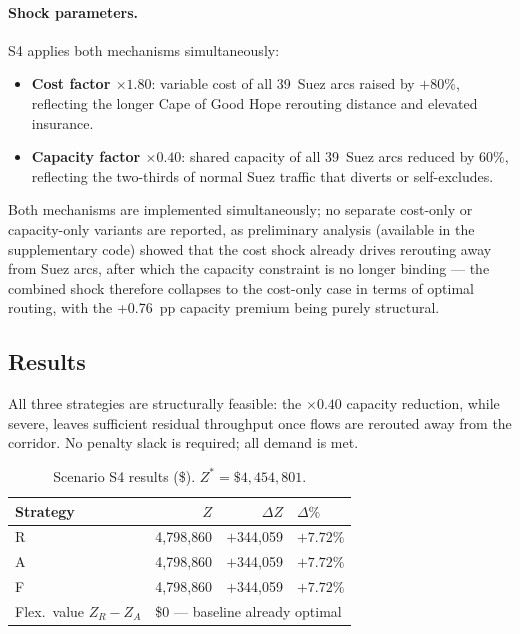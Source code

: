 \paragraph{Shock parameters.}
S4 applies both mechanisms simultaneously:
\begin{itemize}[leftmargin=*,itemsep=2pt]
  \item \textbf{Cost factor $\times 1.80$}: variable cost of all
    39~Suez arcs raised by $+80\%$, reflecting the longer Cape of
    Good Hope rerouting distance and elevated insurance.
  \item \textbf{Capacity factor $\times 0.40$}: shared capacity of
    all 39~Suez arcs reduced by $60\%$, reflecting the two-thirds
    of normal Suez traffic that diverts or self-excludes.
\end{itemize}

Both mechanisms are implemented simultaneously; no separate cost-only
or capacity-only variants are reported, as preliminary analysis
(available in the supplementary code) showed that the cost shock
already drives rerouting away from Suez arcs, after which the capacity
constraint is no longer binding --- the combined shock therefore
collapses to the cost-only case in terms of optimal routing, with the
+0.76~pp capacity premium being purely structural.

\subsection{Results}
\label{sec:s4_results}

All three strategies are structurally feasible: the $\times 0.40$
capacity reduction, while severe, leaves sufficient residual
throughput once flows are rerouted away from the corridor.
No penalty slack is required; all demand is met.

\begin{table}[H]
\centering
\caption{Scenario S4 results (\$). $Z^* = \$4{,}454{,}801$.}
\label{tab:s4_results}
\small
\begin{tabular}{lrrl}
\toprule
\textbf{Strategy} & \textbf{$Z$} & \textbf{$\Delta Z$} & \textbf{$\Delta\%$} \\
\midrule
R & 4{,}798{,}860 & $+$344{,}059 & $+7.72\%$ \\
A & 4{,}798{,}860 & $+$344{,}059 & $+7.72\%$ \\
F & 4{,}798{,}860 & $+$344{,}059 & $+7.72\%$ \\
\midrule
Flex.\ value $Z_R - Z_A$ & \multicolumn{3}{l}{\$0 --- baseline already optimal} \\
\bottomrule
\end{tabular}
\end{table}

